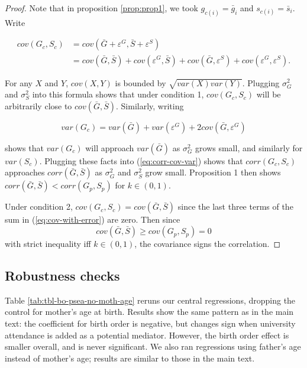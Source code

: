 \documentclass[
]{article}
\begin{document}
\begin{proof}

Note that in proposition \ref{prop:prop1}, we took $g_{c(i)} = \bar{g}_{i}$ and $s_{c(i)} = \bar{s}_i$. Write 

\begin{align}
cov(G_{c},S_{c}) & =cov(\bar{G}+\varepsilon^{G},\bar{S}+\varepsilon^{S})\nonumber \\
 & = cov(\bar{G},\bar{S}) + cov(\varepsilon^{G},\bar{S}) + 
     cov(\bar{G},\varepsilon^{S}) + cov(\varepsilon^{G},\varepsilon^{S}).
 \label{eq:cov-with-error}
\end{align}

For any $X$ and $Y$, $cov(X, Y)$ is bounded by $\sqrt{var(X) var(Y)}$.
Plugging $\sigma_{G}^{2}$ and $\sigma_{S}^{2}$ into this formula
shows that under condition 1, $cov(G_{c},S_{c})$ will be arbitrarily
close to $cov(\bar{G},\bar{S})$. Similarly, writing

\[
var(G_{c}) = var(\bar{G}) + var(\varepsilon^{G}) + 2cov(\bar{G},\varepsilon^{G})
\]

shows that $var(G_{c})$ will approach $var(\bar{G})$ as $\sigma_{G}^{2}$
grows small, and similarly for $var(S_{c})$. Plugging these facts
into (\ref{eq:corr-cov-var}) shows that $corr(G_{c},S_{c})$ approaches
$corr(\bar{G},\bar{S})$ as $\sigma_{G}^{2}$ and $\sigma_{S}^{2}$
grow small. Proposition 1 then shows $corr(\bar{G},\bar{S}) < corr(G_{p},S_{p})$
for $k\in(0,1)$.

Under condition 2, $cov(G_{c}, S_{c}) = cov(\bar{G},\bar{S})$ since
the last three terms of the sum in (\ref{eq:cov-with-error}) are
zero. Then since 
\[
cov(\bar{G},\bar{S})\ge cov(G_{p},S_{p}) = 0
\]
with strict inequality iff $k\in(0,1)$, the covariance signs the
correlation. 

\end{proof}

\FloatBarrier

\newpage

\hypertarget{robustness-checks}{%
\subsection{Robustness checks}\label{robustness-checks}}

Table \ref{tab:tbl-bo-psea-no-moth-age} reruns our central regressions,
dropping the control for mother's age at birth. Results show the same
pattern as in the main text: the coefficient for birth order is
negative, but changes sign when university attendance is added as a
potential mediator. However, the birth order effect is smaller overall,
and is never significant. We also ran regressions using father's age
instead of mother's age; results are similar to those in the main text.
\end{document}
